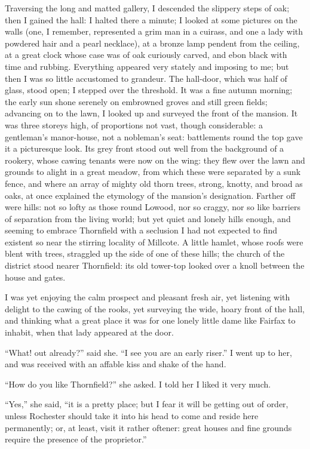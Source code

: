 Traversing the long and matted gallery, I descended the slippery steps
of oak; then I gained the hall: I halted there a minute; I looked at
some pictures on the walls (one, I remember, represented a grim man in a
cuirass, and one a lady with powdered hair and a pearl necklace), at a
bronze lamp pendent from the ceiling, at a great clock whose case was of
oak curiously carved, and ebon black with time and rubbing. Everything
appeared very stately and imposing to me; but then I was so little
accustomed to grandeur. The hall-door, which was half of glass, stood
open; I stepped over the threshold. It was a fine autumn morning; the
early sun shone serenely on embrowned groves and still green fields;
advancing on to the lawn, I looked up and surveyed the front of the
mansion. It was three storeys high, of proportions not vast, though
considerable: a gentleman's manor-house, not a nobleman's seat:
battlements round the top gave it a picturesque look. Its grey front
stood out well from the background of a rookery, whose cawing tenants
were now on the wing: they flew over the lawn and grounds to alight in a
great meadow, from which these were separated by a sunk fence, and where
an array of mighty old thorn trees, strong, knotty, and broad as oaks,
at once explained the etymology of the mansion's designation. Farther
off were hills: not so lofty as those round Lowood, nor so craggy, nor
so like barriers of separation from the living world; but yet quiet and
lonely hills enough, and seeming to embrace Thornfield with a seclusion
I had not expected to find existent so near the stirring locality of
Millcote. A little hamlet, whose roofs were blent with trees, straggled
up the side of one of these hills; the church of the district stood
nearer Thornfield: its old tower-top looked over a knoll between the
house and gates.

I was yet enjoying the calm prospect and pleasant fresh air, yet
listening with delight to the cawing of the rooks, yet surveying the
wide, hoary front of the hall, and thinking what a great place it was
for one lonely little dame like \Mrs{} Fairfax to inhabit, when that lady
appeared at the door.

\enquote{What! out already?} said she. \enquote{I see you are an early
	riser.} I went up to her, and was received with an affable kiss and
shake of the hand.

\enquote{How do you like Thornfield?} she asked. I told her I liked it
very much.

\enquote{Yes,} she said, \enquote{it is a pretty place; but I fear it
	will be getting out of order, unless \Mr{} Rochester should take it into
	his head to come and reside here permanently; or, at least, visit it
	rather oftener: great houses and fine grounds require the presence of
	the proprietor.}


